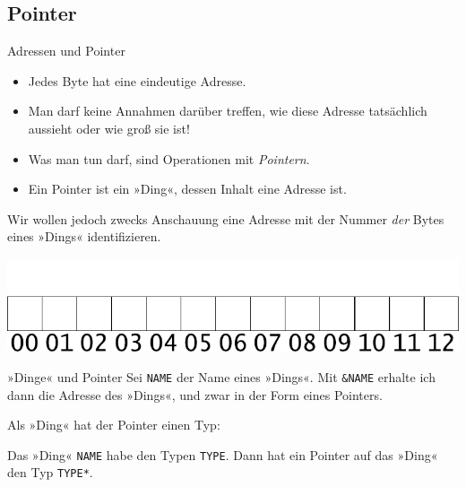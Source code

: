 \subsection{Pointer}

\begin{frame}[fragile]{Adressen und Pointer}
	\begin{itemize}[<+->]
		\item Jedes Byte hat eine eindeutige Adresse.
		\item Man darf keine Annahmen darüber treffen, wie diese Adresse tatsächlich aussieht oder wie groß sie ist!
		\item Was man tun darf, sind Operationen mit \emph{Pointern}.
		\item Ein Pointer ist ein »Ding«, dessen Inhalt eine Adresse ist.
	\end{itemize}
	
	\uncover<+->
	{
		\vspace{1em}
		
		Wir wollen jedoch zwecks Anschauung eine Adresse mit der Nummer \emph{der} Bytes eines »Dings« identifizieren.
	
		\includegraphics[width=\linewidth]{images/free}
	}
\end{frame}

\begin{frame}[fragile]{»Dinge« und Pointer}
	Sei \verb|NAME| der Name eines »Dings«. Mit \verb|&NAME| erhalte ich dann die Adresse des »Dings«, und zwar in der Form eines Pointers.
	
	\vspace{1em}
	\pause
	
	Als »Ding« hat der Pointer einen Typ:
	{\footnotesize
	\begin{block}{}
		
	\end{block}
	}
	
	\pause
	
	Das »Ding« \verb|NAME| habe den Typen \verb|TYPE|. Dann hat ein Pointer auf das »Ding« den Typ \verb|TYPE*|.
\end{frame}


